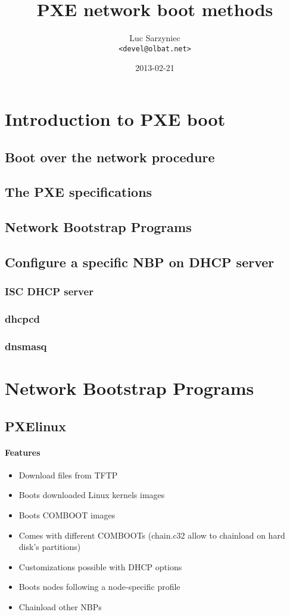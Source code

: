 \documentclass[a4paper,11pt]{article}
\title{PXE network boot methods}
\author{Luc Sarzyniec\\
\footnotesize \texttt{\textless devel@olbat.net\textgreater}}
\date{2013-02-21}
\begin{document}
\maketitle
\tableofcontents
\newpage

\section{Introduction to PXE boot}
\subsection{Boot over the network procedure}
\subsection{The PXE specifications}
\subsection{Network Bootstrap Programs}
\subsection{Configure a specific NBP on DHCP server\label{sec:dhcpconfig}}
\subsubsection{ISC DHCP server}
\subsubsection{dhcpcd}
\subsubsection{dnsmasq}
\newpage

\section{Network Bootstrap Programs}
\subsection{PXElinux}
\paragraph{Features}
\begin{itemize}
  \item Download files from TFTP
  \item Boots downloaded Linux kernels images
  \item Boots COMBOOT images
  \item Comes with different COMBOOTs (chain.c32 allow to chainload on hard disk's partitions)
  \item Customizations possible with DHCP options
  \item Boots nodes following a node-specific profile
  \item Chainload other NBPs
\end{itemize}
\end{document}
